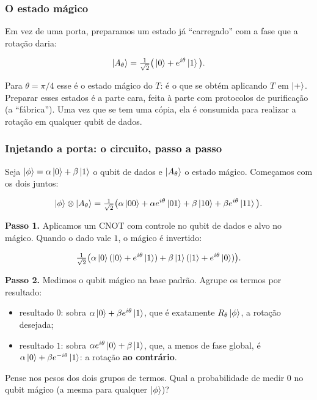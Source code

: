 \subsubsection{O estado mágico}\label{o-estado-muxe1gico}

Em vez de uma porta, preparamos um estado já ``carregado'' com a fase que a rotação daria:

\[
\left|{A_\theta}\right> = \tfrac{1}{\sqrt2}\big(\left|{0}\right> + e^{i\theta}\left|{1}\right>\big).
\]

Para \(\theta = \pi/4\) esse é o estado mágico do \(T\): é o que se obtém aplicando \(T\) em \(\left|{+}\right>\). Preparar esses estados é a parte cara, feita à parte com protocolos de purificação (a ``fábrica''). Uma vez que se tem uma cópia, ela é consumida para realizar a rotação em qualquer qubit de dados.

\subsubsection{Injetando a porta: o circuito, passo a passo}\label{injetando-a-porta-o-circuito-passo-a-passo}

Seja \(\left|{\phi}\right> = \alpha\left|{0}\right> + \beta\left|{1}\right>\) o qubit de dados e \(\left|{A_\theta}\right>\) o estado mágico. Começamos com os dois juntos:

\[
\left|{\phi}\right>\otimes\left|{A_\theta}\right> = \tfrac{1}{\sqrt2}\big(\alpha\left|{00}\right> + \alpha e^{i\theta}\left|{01}\right> + \beta\left|{10}\right> + \beta e^{i\theta}\left|{11}\right>\big).
\]

\textbf{Passo 1.} Aplicamos um CNOT com controle no qubit de dados e alvo no mágico. Quando o dado vale \(1\), o mágico é invertido:

\[
\tfrac{1}{\sqrt2}\big(\alpha\left|{0}\right>(\left|{0}\right> + e^{i\theta}\left|{1}\right>) + \beta\left|{1}\right>(\left|{1}\right> + e^{i\theta}\left|{0}\right>)\big).
\]

\textbf{Passo 2.} Medimos o qubit mágico na base padrão. Agrupe os termos por resultado:

\begin{itemize}
\tightlist
\item
  resultado \(0\): sobra \(\alpha\left|{0}\right> + \beta e^{i\theta}\left|{1}\right>\), que é exatamente \(R_\theta\left|{\phi}\right>\), a rotação desejada;
\item
  resultado \(1\): sobra \(\alpha e^{i\theta}\left|{0}\right> + \beta\left|{1}\right>\), que, a menos de fase global, é \(\alpha\left|{0}\right> + \beta e^{-i\theta}\left|{1}\right>\): a rotação \textbf{ao contrário}.
\end{itemize}

Pense nos pesos dos dois grupos de termos. Qual a probabilidade de medir \(0\) no qubit mágico (a mesma para qualquer \(\left|{\phi}\right>\))?


